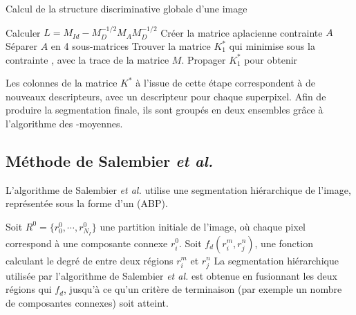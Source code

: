 \begin{algorithm}
\caption{Calcul de la structure discriminative globale d'une image\\
}
\label{algo:sota:ACP}
\begin{algorithmic}[1]
\State Calculer  $L = M_{Id} - M_{D}^{-1/2} M_{A} M_{D}^{-1/2}$
\State Créer la matrice aplacienne contrainte $A$
\State Séparer $A$ en 4 sous-matrices 
\State Trouver la matrice $K_{1}^{*}$ qui minimise  sous la contrainte , avec  la trace de la matrice $M$.
\State Propager $K_{1}^{*}$ pour obtenir 
\end{algorithmic}
\end{algorithm}

 Les colonnes de la matrice $K^{*}$ à l'issue de cette étape correspondent à de nouveaux descripteurs, avec un descripteur pour chaque superpixel. Afin de produire la segmentation finale, ils sont groupés en deux ensembles grâce à l'algorithme des -moyennes. 


\subsection{Méthode de Salembier \textit{et al.}}
\label{subsec:sota:salembier}
L'algorithme de Salembier \textit{et al.} \cite{salembier2000binary} utilise une segmentation hiérarchique de l'image, représentée sous la forme d'un  (ABP). 

Soit $R^{0}=\lbrace r^{0}_{0}, \cdots, r^{0}_{N_{I}} \rbrace$ une partition initiale de l'image, où chaque pixel correspond à une composante connexe $r_{i}^{0}$. Soit $f_{d}(r_{i}^{m},r_{j}^{n})$, une fonction calculant le degré de  entre deux régions $r_{i}^{m}$ et $r_{j}^{n}$ La segmentation hiérarchique utilisée par l'algorithme de Salembier \textit{et al.} est obtenue en fusionnant les deux régions qui  $f_{d}$, jusqu'à ce qu'un critère de terminaison (par exemple un nombre de composantes connexes) soit atteint.

